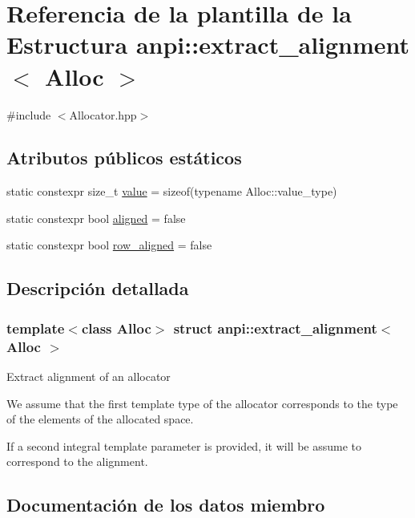 \hypertarget{structanpi_1_1extract__alignment}{}\section{Referencia de la plantilla de la Estructura anpi\+:\+:extract\+\_\+alignment$<$ Alloc $>$}
\label{structanpi_1_1extract__alignment}


{\ttfamily \#include $<$Allocator.\+hpp$>$}

\subsection*{Atributos públicos estáticos}
\begin{DoxyCompactItemize}
\item 
static constexpr size\+\_\+t \hyperlink{structanpi_1_1extract__alignment_aba8462924cf727c3c7df27fa3f32e41f}{value} = sizeof(typename Alloc\+::value\+\_\+type)
\item 
static constexpr bool \hyperlink{structanpi_1_1extract__alignment_a88d37e5eb4f071220ab7f2b09945b096}{aligned} = false
\item 
static constexpr bool \hyperlink{structanpi_1_1extract__alignment_a4e7985310e7f1be7c2277e665bb62a13}{row\+\_\+aligned} = false
\end{DoxyCompactItemize}


\subsection{Descripción detallada}
\subsubsection*{template$<$class Alloc$>$\newline
struct anpi\+::extract\+\_\+alignment$<$ Alloc $>$}

Extract alignment of an allocator

We assume that the first template type of the allocator corresponds to the type of the elements of the allocated space.

If a second integral template parameter is provided, it will be assume to correspond to the alignment. 

\subsection{Documentación de los datos miembro}
\mbox{\label{structanpi_1_1extract__alignment_a88d37e5eb4f071220ab7f2b09945b096}} 
